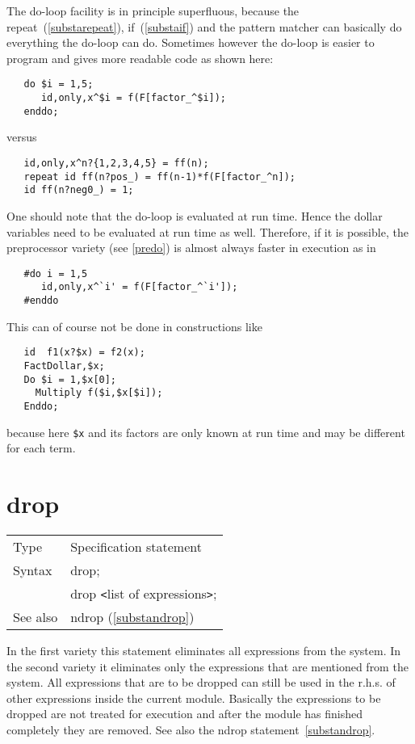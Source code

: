 \noindent The do-loop facility is in principle superfluous, because the 
repeat~(\ref{substarepeat}), if~(\ref{substaif}) and the pattern matcher can 
basically do everything the do-loop can do. Sometimes however the do-loop 
is easier to program and gives more readable code as shown here:
\begin{verbatim}
   do $i = 1,5;
      id,only,x^$i = f(F[factor_^$i]);
   enddo;
\end{verbatim}
\noindent versus
\begin{verbatim}
   id,only,x^n?{1,2,3,4,5} = ff(n);
   repeat id ff(n?pos_) = ff(n-1)*f(F[factor_^n]);
   id ff(n?neg0_) = 1;
\end{verbatim}
\noindent One should note that the do-loop is evaluated at run time. Hence 
the dollar variables need to be evaluated at run time as well. Therefore, 
if it is possible, the preprocessor variety (see \ref{predo}) is almost 
always faster in execution as in
\begin{verbatim}
   #do i = 1,5
      id,only,x^`i' = f(F[factor_^`i']);
   #enddo
\end{verbatim}
\noindent This can of course not be done in constructions like
\begin{verbatim}
   id  f1(x?$x) = f2(x);
   FactDollar,$x;
   Do $i = 1,$x[0];
     Multiply f($i,$x[$i]);
   Enddo;
\end{verbatim}
\noindent because here \verb:$x: and its factors are only known at run time 
and may be different for each term.
\vspace{10mm}


\section{drop}
\label{substadrop}

\noindent \begin{tabular}{ll}
Type & Specification statement\\
Syntax & drop; \\
       & drop {\tt<}list of expressions{\tt>};
\\ See also & ndrop (\ref{substandrop})
\end{tabular} \vspace{4mm}

\noindent In the first variety this statement eliminates all 
expressions from the system. In the second variety it 
eliminates only the expressions that are mentioned from the system. All 
expressions that are to be dropped can still be used in the r.h.s. of other 
expressions inside the current module. Basically the expressions to be 
dropped are not treated for execution and after the module has finished 
completely they are removed. See also the ndrop 
statement~\ref{substandrop}. \vspace{10mm}


